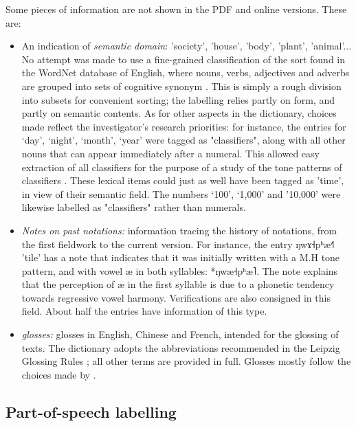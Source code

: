 \documentclass[oldfontcommands,oneside,a4paper,11pt]{article}
\newcommand{\ipa}[1]{{\phon #1}} %
\begin{document}
	Some pieces of information are not shown in the PDF and online versions. These are:
	\begin{itemize}
		\item An indication of \textit{semantic domain}: 'society', 'house', 'body', 'plant', 'animal'... No attempt was made to use a fine-grained classification of the sort found in the WordNet database of English, where nouns, verbs, adjectives and adverbs are grouped into sets of cognitive synonym \citep{Fellbaum 2005}. This is simply a rough division into subsets for convenient sorting; the labelling relies partly on form, and partly on semantic contents. As for other aspects in the dictionary, choices made reflect the investigator's research priorities: for instance, the entries for ‘day’, ‘night’, ‘month’, ‘year’ were tagged as "classifiers", along with all other nouns that can appear immediately after a numeral. This allowed easy extraction of all classifiers for the purpose of a study of the tone patterns of classifiers \citep{Michaud2013}. These lexical items could just as well have been tagged as 'time', in view of their semantic field. The numbers ‘100’, ‘1,000’ and ’10,000’ were likewise labelled as "classifiers" rather than numerals.
		\item \textit{Notes on past notations:} information tracing the history of notations, from the first fieldwork to the current version. For instance, the entry \ipa{ŋwɤ˧pʰæ˧˥} 'tile' has a note that indicates that it was initially written with a M.H tone pattern, and with vowel \ipa{æ} in both syllables: *\ipa{ŋwæ˧pʰæ˥}. The note explains that the perception of \ipa{æ} in the first syllable is due to a phonetic tendency towards regressive vowel harmony. Verifications are also consigned in this field. About half the entries have information of this type.
		\item \textit{glosses:} glosses in English, Chinese and French, intended for the glossing of texts. The dictionary adopts the abbreviations recommended in the Leipzig Glossing Rules \citep{Comrie}; all other terms are provided in full. Glosses mostly follow the choices made by \citep{Lidz2010}.
	\end{itemize}
	
	\subsection{Part-of-speech labelling} \label{sec:pos}
	
\end{document}
